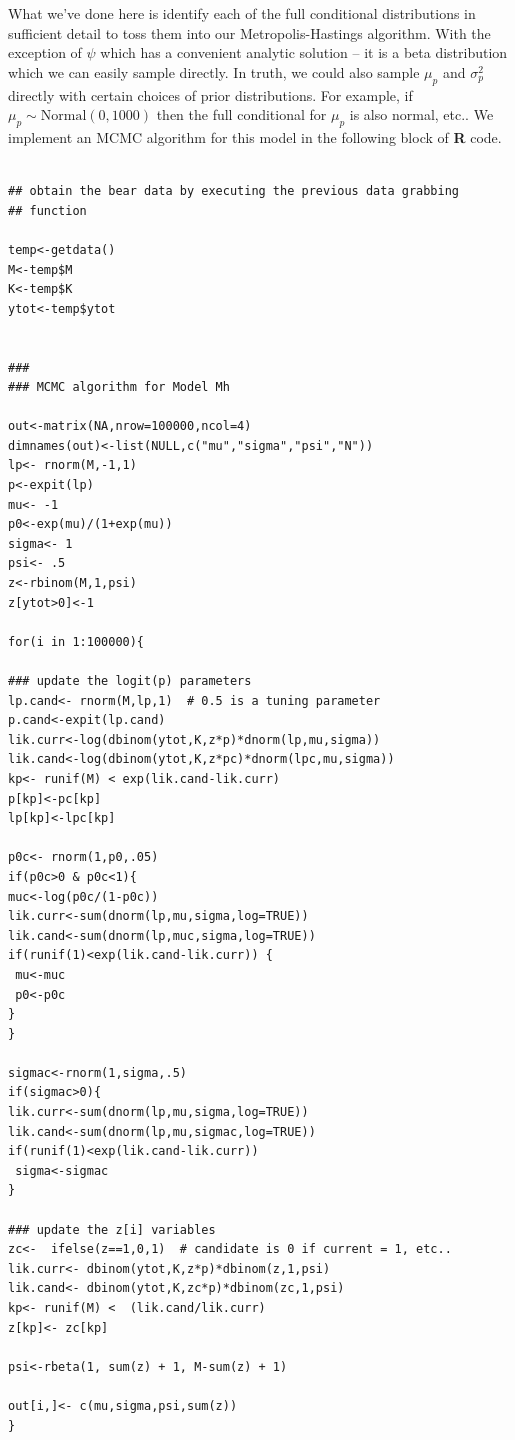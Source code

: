 What we've done here is identify each of the full conditional
distributions in sufficient detail to toss them into our
Metropolis-Hastings algorithm. With the exception of $\psi$ which has
a convenient analytic solution -- it is a beta distribution which we
can easily sample directly. In truth, we could also sample $\mu_{p}$
and $\sigma_{p}^{2}$ directly with certain choices of prior
distributions. For example, if $\mu_{p} \sim \mbox{Normal}(0, 1000)$
then the full conditional for $\mu_{p}$ is also normal, etc..
We implement an MCMC algorithm for this model in the following block
of {\bf R} code.  
\begin{verbatim}

## obtain the bear data by executing the previous data grabbing
## function

temp<-getdata()
M<-temp$M
K<-temp$K
ytot<-temp$ytot


###
### MCMC algorithm for Model Mh

out<-matrix(NA,nrow=100000,ncol=4)
dimnames(out)<-list(NULL,c("mu","sigma","psi","N"))
lp<- rnorm(M,-1,1)
p<-expit(lp)
mu<- -1
p0<-exp(mu)/(1+exp(mu))
sigma<- 1
psi<- .5
z<-rbinom(M,1,psi)
z[ytot>0]<-1

for(i in 1:100000){

### update the logit(p) parameters
lp.cand<- rnorm(M,lp,1)  # 0.5 is a tuning parameter
p.cand<-expit(lp.cand)
lik.curr<-log(dbinom(ytot,K,z*p)*dnorm(lp,mu,sigma))
lik.cand<-log(dbinom(ytot,K,z*pc)*dnorm(lpc,mu,sigma))
kp<- runif(M) < exp(lik.cand-lik.curr)
p[kp]<-pc[kp]
lp[kp]<-lpc[kp]

p0c<- rnorm(1,p0,.05)
if(p0c>0 & p0c<1){
muc<-log(p0c/(1-p0c))
lik.curr<-sum(dnorm(lp,mu,sigma,log=TRUE))
lik.cand<-sum(dnorm(lp,muc,sigma,log=TRUE))
if(runif(1)<exp(lik.cand-lik.curr)) {
 mu<-muc
 p0<-p0c
}
}

sigmac<-rnorm(1,sigma,.5)
if(sigmac>0){
lik.curr<-sum(dnorm(lp,mu,sigma,log=TRUE))
lik.cand<-sum(dnorm(lp,mu,sigmac,log=TRUE))
if(runif(1)<exp(lik.cand-lik.curr))
 sigma<-sigmac
}

### update the z[i] variables
zc<-  ifelse(z==1,0,1)  # candidate is 0 if current = 1, etc..
lik.curr<- dbinom(ytot,K,z*p)*dbinom(z,1,psi)
lik.cand<- dbinom(ytot,K,zc*p)*dbinom(zc,1,psi)
kp<- runif(M) <  (lik.cand/lik.curr)
z[kp]<- zc[kp]

psi<-rbeta(1, sum(z) + 1, M-sum(z) + 1)

out[i,]<- c(mu,sigma,psi,sum(z))
}
\end{verbatim}



